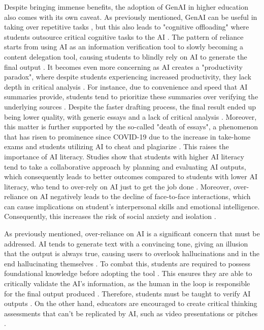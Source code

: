 \documentclass{article}
\begin{document}
Despite bringing immense benefits, the adoption of GenAI 
in higher education also comes with its own caveat.
As previously mentioned, GenAI can be useful in taking over repetitive tasks \cite{xia2025systematic}, 
but this also leads to "cognitive offloading" 
where students outsource critical cognitive tasks to the AI \cite{xia2025systematic}. 
The pattern of reliance starts from using AI as an information verification tool 
to slowly becoming a content delegation tool, causing students to blindly rely on 
AI to generate the final output \cite{Hou2025}.
It becomes even more concerning as AI creates a "productivity paradox", 
where despite students experiencing increased productivity, 
they lack depth in critical analysis \cite{Wang2024}.
For instance, due to convenience and speed that AI summaries provide, 
students tend to prioritize these summaries over verifying the underlying sources \cite{Loughlin2026}.
Despite the faster drafting process, the final result ended up being lower quality, 
with generic essays and a lack of critical analysis \cite{sallai2024approach,Wang2024}. 
Moreover, this matter is further supported by the so-called "death of essays", 
a phenomenon that has risen to prominence since COVID-19 due to the 
increase in take-home exams and students utilizing AI to cheat and plagiarize \cite{sallai2024approach}.
This raises the importance of AI literacy.
Studies show that students with higher AI literacy tend to take a collaborative approach 
by planning and evaluating AI outputs, which consequently leads to better outcomes compared 
to students with lower AI literacy, who tend to over-rely on AI just to get the job done \cite{KimetAl2026}.
Moreover, over-reliance on AI negatively leads to the decline of face-to-face interactions, which can 
cause implications on student's interpersonal skills and emotional intelligence. Consequently, this 
increases the risk of social anxiety and isolation \cite{KlimovaPikhart2025}.

As previously mentioned, over-reliance on AI is a significant concern 
that must be addressed. AI tends to generate text with a 
convincing tone, giving an illusion that the output is always true, 
causing users to overlook hallucinations and in the end hallucinating themselves \cite{sallai2024approach, Loughlin2026}.
To combat this, students are required to possess foundational 
knowledge before adopting the tool \cite{sallai2024approach, Jin2025}.
This ensures they are able to critically validate the AI's information, 
as the human in the loop is responsible for the final output produced \cite{sallai2024approach,Lo2023}. 
Therefore, students must be taught to verify AI outputs \cite{Mollick2023}. 
On the other hand, educators are encouraged to create critical thinking assessments 
that can't be replicated by AI, such as video presentations or pitches \cite{Mollick2023,sallai2024approach}.
\end{document}
